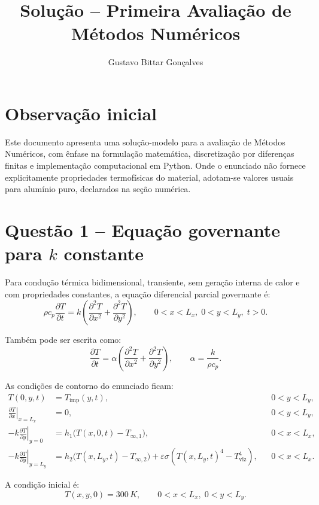 \documentclass[12pt,a4paper]{article}
\title{Solução -- Primeira Avaliação de Métodos Numéricos}
\author{Gustavo Bittar Gonçalves}
\date{}
\begin{document}
\maketitle

\section*{Observação inicial}
Este documento apresenta uma solução-modelo para a avaliação de Métodos Numéricos, com ênfase na formulação matemática, discretização por diferenças finitas e implementação computacional em Python. Onde o enunciado não fornece explicitamente propriedades termofísicas do material, adotam-se valores usuais para alumínio puro, declarados na seção numérica.

\section{Questão 1 -- Equação governante para $k$ constante}
Para condução térmica bidimensional, transiente, sem geração interna de calor e com propriedades constantes, a equação diferencial parcial governante é:
\begin{equation}
\rho c_p \frac{\partial T}{\partial t} = k\left(\frac{\partial^2 T}{\partial x^2}+\frac{\partial^2 T}{\partial y^2}\right),
\qquad 0<x<L_x,\;0<y<L_y,\;t>0.
\end{equation}

Também pode ser escrita como:
\begin{equation}
\frac{\partial T}{\partial t} = \alpha \left(\frac{\partial^2 T}{\partial x^2}+\frac{\partial^2 T}{\partial y^2}\right),
\qquad \alpha = \frac{k}{\rho c_p}.
\end{equation}

As condições de contorno do enunciado ficam:
\begin{align}
T(0,y,t) &= T_{\text{imp}}(y,t), && 0<y<L_y, \\
\left.\frac{\partial T}{\partial x}\right|_{x=L_x} &= 0, && 0<y<L_y, \\
-k\left.\frac{\partial T}{\partial y}\right|_{y=0} &= h_1\big(T(x,0,t)-T_{\infty,1}\big), && 0<x<L_x, \\
-k\left.\frac{\partial T}{\partial y}\right|_{y=L_y} &= h_2\big(T(x,L_y,t)-T_{\infty,2}\big) + \varepsilon\sigma\left(T(x,L_y,t)^4-T_{\text{viz}}^4\right), && 0<x<L_x.
\end{align}

A condição inicial é:
\begin{equation}
T(x,y,0)=300\,\si{K}, \qquad 0<x<L_x,\;0<y<L_y.
\end{equation}
\end{document}
